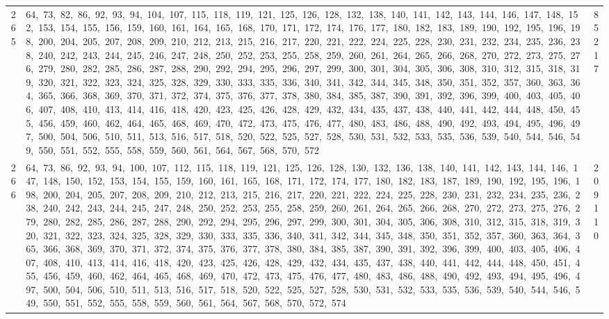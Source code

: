 \begin{longtable}{c|p{}|r}
265 & 64,\ 73,\ 82,\ 86,\ 92,\ 93,\ 94,\ 104,\ 107,\ 115,\ 118,\ 119,\ 121,\ 125,\ 126,\ 128,\ 132,\ 138,\ 140,\ 141,\ 142,\ 143,\ 144,\ 146,\ 147,\ 148,\ 152,\ 153,\ 154,\ 155,\ 156,\ 159,\ 160,\ 161,\ 164,\ 165,\ 168,\ 170,\ 171,\ 172,\ 174,\ 176,\ 177,\ 180,\ 182,\ 183,\ 189,\ 190,\ 192,\ 195,\ 196,\ 198,\ 200,\ 204,\ 205,\ 207,\ 208,\ 209,\ 210,\ 212,\ 213,\ 215,\ 216,\ 217,\ 220,\ 221,\ 222,\ 224,\ 225,\ 228,\ 230,\ 231,\ 232,\ 234,\ 235,\ 236,\ 238,\ 240,\ 242,\ 243,\ 244,\ 245,\ 246,\ 247,\ 248,\ 250,\ 252,\ 253,\ 255,\ 258,\ 259,\ 260,\ 261,\ 264,\ 265,\ 266,\ 268,\ 270,\ 272,\ 273,\ 275,\ 276,\ 279,\ 280,\ 282,\ 285,\ 286,\ 287,\ 288,\ 290,\ 292,\ 294,\ 295,\ 296,\ 297,\ 299,\ 300,\ 301,\ 304,\ 305,\ 306,\ 308,\ 310,\ 312,\ 315,\ 318,\ 319,\ 320,\ 321,\ 322,\ 323,\ 324,\ 325,\ 328,\ 329,\ 330,\ 333,\ 335,\ 336,\ 340,\ 341,\ 342,\ 344,\ 345,\ 348,\ 350,\ 351,\ 352,\ 357,\ 360,\ 363,\ 364,\ 365,\ 366,\ 368,\ 369,\ 370,\ 371,\ 372,\ 374,\ 375,\ 376,\ 377,\ 378,\ 380,\ 384,\ 385,\ 387,\ 390,\ 391,\ 392,\ 396,\ 399,\ 400,\ 403,\ 405,\ 406,\ 407,\ 408,\ 410,\ 413,\ 414,\ 416,\ 418,\ 420,\ 423,\ 425,\ 426,\ 428,\ 429,\ 432,\ 434,\ 435,\ 437,\ 438,\ 440,\ 441,\ 442,\ 444,\ 448,\ 450,\ 455,\ 456,\ 459,\ 460,\ 462,\ 464,\ 465,\ 468,\ 469,\ 470,\ 472,\ 473,\ 475,\ 476,\ 477,\ 480,\ 483,\ 486,\ 488,\ 490,\ 492,\ 493,\ 494,\ 495,\ 496,\ 497,\ 500,\ 504,\ 506,\ 510,\ 511,\ 513,\ 516,\ 517,\ 518,\ 520,\ 522,\ 525,\ 527,\ 528,\ 530,\ 531,\ 532,\ 533,\ 535,\ 536,\ 539,\ 540,\ 544,\ 546,\ 549,\ 550,\ 551,\ 552,\ 555,\ 558,\ 559,\ 560,\ 561,\ 564,\ 567,\ 568,\ 570,\ 572 & 85217 \\
266 & 64,\ 73,\ 86,\ 92,\ 93,\ 94,\ 100,\ 107,\ 112,\ 115,\ 118,\ 119,\ 121,\ 125,\ 126,\ 128,\ 130,\ 132,\ 136,\ 138,\ 140,\ 141,\ 142,\ 143,\ 144,\ 146,\ 147,\ 148,\ 150,\ 152,\ 153,\ 154,\ 155,\ 159,\ 160,\ 161,\ 165,\ 168,\ 171,\ 172,\ 174,\ 177,\ 180,\ 182,\ 183,\ 187,\ 189,\ 190,\ 192,\ 195,\ 196,\ 198,\ 200,\ 204,\ 205,\ 207,\ 208,\ 209,\ 210,\ 212,\ 213,\ 215,\ 216,\ 217,\ 220,\ 221,\ 222,\ 224,\ 225,\ 228,\ 230,\ 231,\ 232,\ 234,\ 235,\ 236,\ 238,\ 240,\ 242,\ 243,\ 244,\ 245,\ 247,\ 248,\ 250,\ 252,\ 253,\ 255,\ 258,\ 259,\ 260,\ 261,\ 264,\ 265,\ 266,\ 268,\ 270,\ 272,\ 273,\ 275,\ 276,\ 279,\ 280,\ 282,\ 285,\ 286,\ 287,\ 288,\ 290,\ 292,\ 294,\ 295,\ 296,\ 297,\ 299,\ 300,\ 301,\ 304,\ 305,\ 306,\ 308,\ 310,\ 312,\ 315,\ 318,\ 319,\ 320,\ 321,\ 322,\ 323,\ 324,\ 325,\ 328,\ 329,\ 330,\ 333,\ 335,\ 336,\ 340,\ 341,\ 342,\ 344,\ 345,\ 348,\ 350,\ 351,\ 352,\ 357,\ 360,\ 363,\ 364,\ 365,\ 366,\ 368,\ 369,\ 370,\ 371,\ 372,\ 374,\ 375,\ 376,\ 377,\ 378,\ 380,\ 384,\ 385,\ 387,\ 390,\ 391,\ 392,\ 396,\ 399,\ 400,\ 403,\ 405,\ 406,\ 407,\ 408,\ 410,\ 413,\ 414,\ 416,\ 418,\ 420,\ 423,\ 425,\ 426,\ 428,\ 429,\ 432,\ 434,\ 435,\ 437,\ 438,\ 440,\ 441,\ 442,\ 444,\ 448,\ 450,\ 451,\ 455,\ 456,\ 459,\ 460,\ 462,\ 464,\ 465,\ 468,\ 469,\ 470,\ 472,\ 473,\ 475,\ 476,\ 477,\ 480,\ 483,\ 486,\ 488,\ 490,\ 492,\ 493,\ 494,\ 495,\ 496,\ 497,\ 500,\ 504,\ 506,\ 510,\ 511,\ 513,\ 516,\ 517,\ 518,\ 520,\ 522,\ 525,\ 527,\ 528,\ 530,\ 531,\ 532,\ 533,\ 535,\ 536,\ 539,\ 540,\ 544,\ 546,\ 549,\ 550,\ 551,\ 552,\ 555,\ 558,\ 559,\ 560,\ 561,\ 564,\ 567,\ 568,\ 570,\ 572,\ 574 & 209110 \\

\end{longtable}
